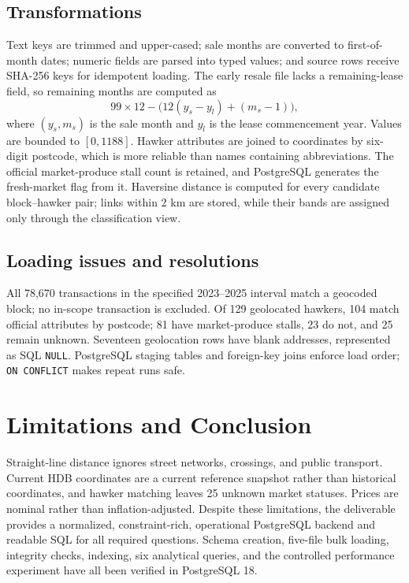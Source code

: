 \documentclass[11pt,a4paper]{article}
\begin{document}
\subsection{Transformations}
Text keys are trimmed and upper-cased; sale months are converted to first-of-month dates;
numeric fields are parsed into typed values; and source rows receive SHA-256 keys for
idempotent loading. The early resale file lacks a remaining-lease field, so remaining
months are computed as
\[
  99\times12 - \bigl(12(y_s-y_l)+(m_s-1)\bigr),
\]
where $(y_s,m_s)$ is the sale month and $y_l$ is the lease commencement year. Values are
bounded to $[0,1188]$. Hawker attributes are joined to coordinates by six-digit postcode,
which is more reliable than names containing abbreviations. The official market-produce
stall count is retained, and PostgreSQL generates the fresh-market flag from it. Haversine
distance is computed for every candidate block--hawker pair; links within 2 km are stored,
while their bands are assigned only through the classification view.

\subsection{Loading issues and resolutions}
All 78,670 transactions in the specified 2023--2025 interval match a geocoded block;
no in-scope transaction is excluded. Of 129 geolocated hawkers, 104 match official attributes by postcode;
81 have market-produce stalls, 23 do not, and 25 remain unknown. Seventeen geolocation rows
have blank addresses, represented as SQL \texttt{NULL}. PostgreSQL staging tables and
foreign-key joins enforce load order; \texttt{ON CONFLICT} makes repeat runs safe.



\section{Limitations and Conclusion}
Straight-line distance ignores street networks, crossings, and public transport. Current
HDB coordinates are a current reference snapshot rather than historical coordinates, and hawker matching leaves
25 unknown market statuses. Prices are nominal rather than inflation-adjusted. Despite
these limitations, the deliverable provides a normalized, constraint-rich, operational
PostgreSQL backend and readable SQL for all required questions. Schema creation, five-file
bulk loading, integrity checks, indexing, six analytical queries, and the controlled
performance experiment have all been verified in PostgreSQL 18.
\end{document}

